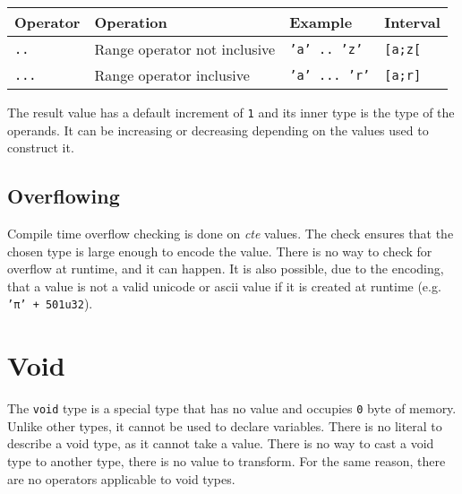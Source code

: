 \begin{itemize}
  \begin{center}
    \vspace{-10pt}\begin{adjustbox}{max width=1.0\linewidth}
      \begin{tabular}{|l|lll|}
        \hline
        Operator & Operation & Example & Interval\\[0pt]
        \hline
        \hline
        \texttt{..} & Range operator not inclusive & \texttt{'a' .. 'z'} & \texttt{[a;z[}\\[0pt]
            \texttt{...} & Range operator inclusive & \texttt{'a' ... 'r'} & \texttt{[a;r]}\\[0pt]
            \hline
      \end{tabular}
  \end{adjustbox}\end{center}


  The result value has a default increment of \texttt{1} and its inner type is
  the type of the operands. It can be increasing or decreasing depending on the
  values used to construct it.

\end{itemize}

\subsection{Overflowing}
\label{sec:orga9c18c5}

Compile time overflow checking is done on \textit{cte} values. The check ensures
that the chosen type is large enough to encode the value. There is no way to
check for overflow at runtime, and it can happen. It is also possible, due to
the encoding, that a value is not a valid unicode or ascii value if it is
created at runtime (e.g. \texttt{'π' + 501u32}).

\section{Void}
\label{sec:org409c2d8}

The \texttt{void} type is a special type that has no value and occupies
\texttt{0} byte of memory. Unlike other types, it cannot be used to declare
variables. There is no literal to describe a void type, as it cannot take a
value. There is no way to cast a void type to another type, there is no value to
transform. For the same reason, there are no operators applicable to void types.

\vspace{-10pt}
